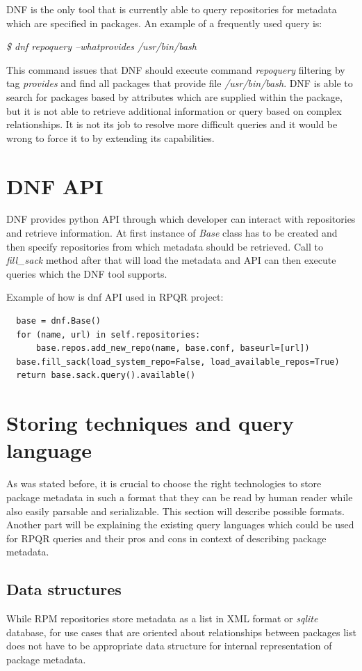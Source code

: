 DNF is the only tool that is currently able to query repositories for metadata which are specified
in packages. An example of a frequently used query is:

\textit{\$ dnf repoquery --whatprovides /usr/bin/bash}

This command issues that DNF should execute command \textit{repoquery} filtering by tag \mbox{\textit{provides}}
and find all packages that provide file \textit{/usr/bin/bash}. DNF is able to search for packages based by
attributes which are supplied within the package, but it is not able to retrieve additional information
or query based on complex relationships. It is not its job to resolve more difficult queries and
it would be wrong to force it to by extending its capabilities.

\section{DNF API}
DNF provides python API through which developer can interact with repositories and retrieve information.
At first instance of \textit{Base} class has to be created and then specify repositories from which
metadata should be retrieved. Call to \textit{fill\_sack} method after that will load the metadata
and API can then execute queries which the DNF tool supports.

Example of how is dnf API used in RPQR project:
\begin{lstlisting}
  base = dnf.Base()
  for (name, url) in self.repositories:
      base.repos.add_new_repo(name, base.conf, baseurl=[url])
  base.fill_sack(load_system_repo=False, load_available_repos=True)
  return base.sack.query().available()
\end{lstlisting}

\section{Storing techniques and query language}
As was stated before, it is crucial to choose the right technologies to store package metadata in
such a format that they can be read by human reader while also easily parsable and serializable.
This section will describe possible formats. Another part will be explaining the existing query
languages which could be used for RPQR queries and their pros and cons in context of describing
package metadata.

\subsection*{Data structures}
While RPM repositories store metadata as a list in XML format or \textit{sqlite} database, for use cases that
are oriented about relationships between packages list does not have to be appropriate data
structure for internal representation of package metadata.

